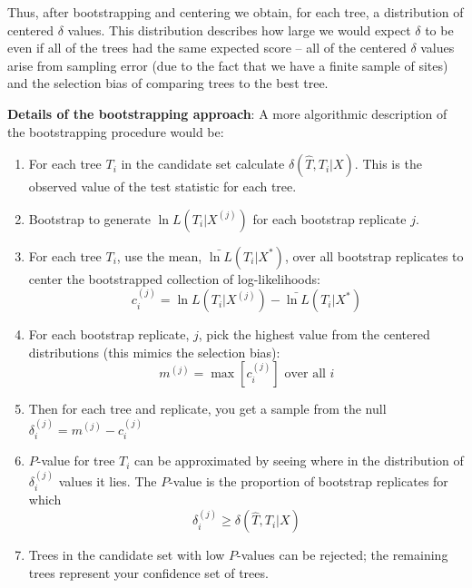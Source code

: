 \documentclass[11pt]{article}
\renewcommand{\subsubsection}[1]{%
\noindent\textbf{#1}:}
\newcommand{\pvalues}{$P$-values\xspace}
\begin{document}
Thus, after bootstrapping and centering we obtain, for each tree, a distribution of centered $\delta$ values. 
This distribution describes how large we would expect $\delta$ to be even if all of the trees had the same expected score -- all of the centered $\delta$ values arise from sampling error (due to the fact that we have a finite sample of sites) and the selection bias of comparing trees to the best tree.

\subsubsection{Details of the bootstrapping approach}
A more algorithmic description of the bootstrapping procedure would be:
\begin{enumerate}
	\item For each tree $T_i$ in the candidate set calculate $\delta(\hat{T}, T_i|X)$. This is the observed value of the test statistic for each tree.
	\item Bootstrap to generate ${\ln L}(T_i|X^{(j)})$ for each bootstrap replicate $j$.
	\item For each tree $T_i$, use the mean, $\bar{\ln L}(T_i|X^{\ast})$, over all bootstrap replicates to center the bootstrapped collection of log-likelihoods:
		$$c_i^{(j)} = {\ln L}(T_i|X^{(j)})-\bar{\ln L}(T_i|X^{\ast})$$
	\item For each bootstrap replicate, $j$, pick the highest value from the centered distributions (this mimics the selection bias): $$m^{(j)} = \max\left[c_i^{(j)}\right] \mbox{ over all } i$$
	\item Then for each tree and replicate, you get a sample from the null $\delta_i^{(j)} = m^{(j)} - c_i^{(j)}$
	\item $P$-value for tree $T_i$ can be approximated by seeing where in the distribution of $\delta_i^{(j)}$ values it lies. The $P$-value is the proportion of bootstrap replicates for which $$\delta_i^{(j)} \geq \delta(\hat{T}, T_i|X)$$
	\item Trees in the candidate set with low \pvalues can be rejected; the remaining trees represent your confidence set of trees.
\end{enumerate}
\end{document}
